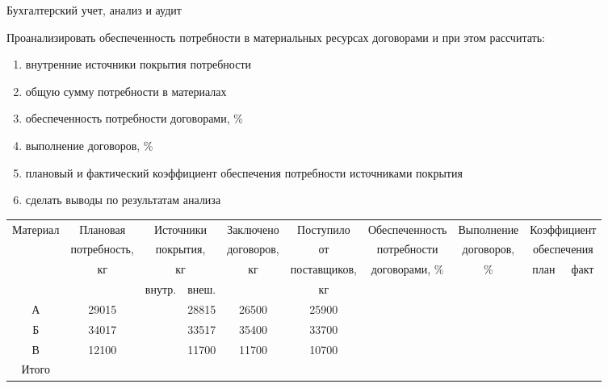 \documentclass[
	11pt,
	a4paper,
	]
	{article}
\begin{document}
\begin{center}\lowGE * \end{center}
\newpage



 {Бухгалтерский учет, анализ и аудит}
\prGE

	Проанализировать обеспеченность потребности в материальных ресурсах договорами и при этом рассчитать:

\begin{enumerate}
	\item внутренние источники покрытия потребности
	\item общую сумму потребности в материалах
	\item обеспеченность потребности договорами, \%
	\item выполнение договоров, \%
	\item плановый и фактический коэффициент обеспечения потребности источниками покрытия
	\item сделать выводы по результатам анализа
\end{enumerate}


\begin{table}[ht!]\footnotesize\centering
\begin{tabular}{|c |c |c|c |c |c |c |c |c|c |}
\hline
Материал &
Плановая &
\multicolumn{2}{c|}{Источники} &
Заключено &
Поступило &
Обеспеченность &
Выполнение &
\multicolumn{2}{c|}{Коэффициент} \\
& 
потребность, &
\multicolumn{2}{c|}{покрытия,} &
договоров, &
от &
потребности &
договоров, &
\multicolumn{2}{c|}{обеспечения} \\ \cline{9-10}
&
кг &
\multicolumn{2}{c|}{кг} &
кг &
поставщиков, &
договорами, \% &
\% &
план &
факт \\ \cline{3-4}
&
&
внутр. &
внеш. &
&
кг &
&
&
&
\\ \hline 
А & 29015 & & 28815 & 26500 & 25900 & & & & \\ \hline
Б & 34017 & & 33517 & 35400 & 33700 & & & & \\ \hline 
В & 12100 & & 11700 & 11700 & 10700 & & & & \\ \hline
Итого & & & & & & & & & \\ \hline
\end{tabular}
\end{table}

\begin{center}\lowGE * \end{center}
\newpage
\end{document}
